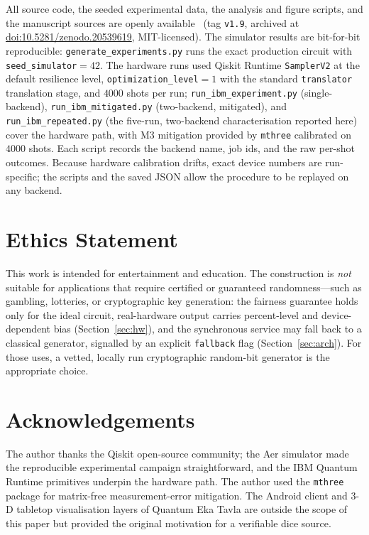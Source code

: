 \documentclass[journal]{IEEEtran}
\begin{document}
All source code, the seeded experimental data, the analysis and figure scripts, and the manuscript sources are openly available~\cite{projectrepo} (tag \texttt{v1.9}, archived at \href{https://doi.org/10.5281/zenodo.20539619}{doi:10.5281/zenodo.20539619}, MIT-licensed). The simulator results are bit-for-bit reproducible: \texttt{generate\_experiments.py} runs the exact production circuit with \texttt{seed\_simulator}$=42$. The hardware runs used Qiskit Runtime \texttt{SamplerV2} at the default resilience level, \texttt{optimization\_level}$=1$ with the standard \texttt{translator} translation stage, and $4000$ shots per run; \texttt{run\_ibm\_experiment.py} (single-backend), \texttt{run\_ibm\_mitigated.py} (two-backend, mitigated), and \texttt{run\_ibm\_repeated.py} (the five-run, two-backend characterisation reported here) cover the hardware path, with M3 mitigation provided by \texttt{mthree} calibrated on $4000$ shots. Each script records the backend name, job ids, and the raw per-shot outcomes. Because hardware calibration drifts, exact device numbers are run-specific; the scripts and the saved JSON allow the procedure to be replayed on any backend.

\section*{Ethics Statement}

This work is intended for entertainment and education. The construction is \emph{not} suitable for applications that require certified or guaranteed randomness---such as gambling, lotteries, or cryptographic key generation: the fairness guarantee holds only for the ideal circuit, real-hardware output carries percent-level and device-dependent bias (Section~\ref{sec:hw}), and the synchronous service may fall back to a classical generator, signalled by an explicit \texttt{fallback} flag (Section~\ref{sec:arch}). For those uses, a vetted, locally run cryptographic random-bit generator is the appropriate choice.

\section*{Acknowledgements}

The author thanks the Qiskit open-source community; the Aer simulator made the reproducible experimental campaign straightforward, and the IBM Quantum Runtime primitives underpin the hardware path. The author used the \texttt{mthree} package for matrix-free measurement-error mitigation. The Android client and 3-D tabletop visualisation layers of Quantum Eka Tavla are outside the scope of this paper but provided the original motivation for a verifiable dice source.



\end{document}
